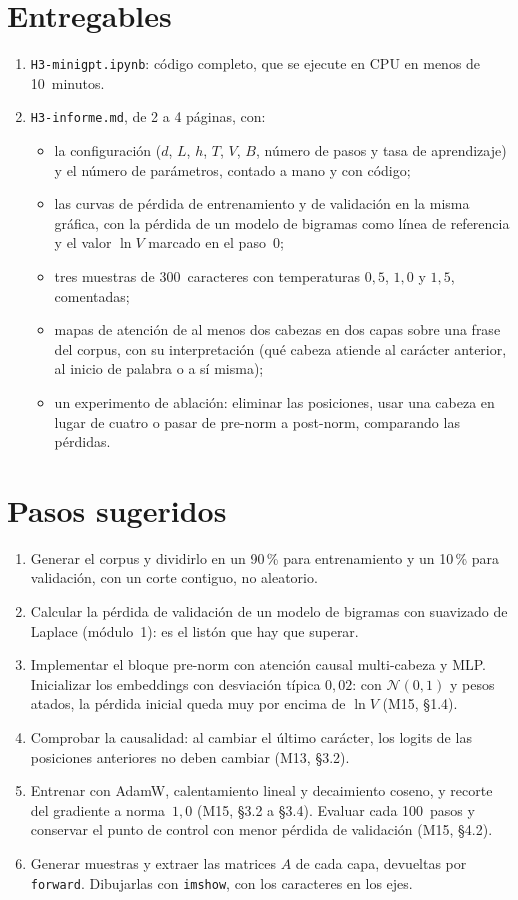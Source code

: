 \section*{Entregables}
\begin{enumerate}[label=\arabic*.]
  \item \texttt{H3-minigpt.ipynb}: código completo, que se ejecute en CPU en menos de 10~minutos.
  \item \texttt{H3-informe.md}, de 2 a 4 páginas, con:
  \begin{itemize}[label=\textendash]
    \item la configuración ($d$, $L$, $h$, $T$, $V$, $B$, número de pasos y tasa de aprendizaje) y el número de parámetros, contado a mano y con código;
    \item las curvas de pérdida de entrenamiento y de validación en la misma gráfica, con la pérdida de un modelo de bigramas como línea de referencia y el valor $\ln V$ marcado en el paso~0;
    \item tres muestras de 300~caracteres con temperaturas $0{,}5$, $1{,}0$ y $1{,}5$, comentadas;
    \item mapas de atención de al menos dos cabezas en dos capas sobre una frase del corpus, con su interpretación (qué cabeza atiende al carácter anterior, al inicio de palabra o a sí misma);
    \item un experimento de ablación: eliminar las posiciones, usar una cabeza en lugar de cuatro o pasar de pre-norm a post-norm, comparando las pérdidas.
  \end{itemize}
\end{enumerate}

\section*{Pasos sugeridos}
\begin{enumerate}[label=\arabic*.]
  \item Generar el corpus y dividirlo en un 90\,\% para entrenamiento y un 10\,\% para validación, con un corte contiguo, no aleatorio.
  \item Calcular la pérdida de validación de un modelo de bigramas con suavizado de Laplace (módulo~1): es el listón que hay que superar.
  \item Implementar el bloque pre-norm con atención causal multi-cabeza y MLP. Inicializar los embeddings con desviación típica $0{,}02$: con $\mathcal N(0,1)$ y pesos atados, la pérdida inicial queda muy por encima de $\ln V$ (M15, §1.4).
  \item Comprobar la causalidad: al cambiar el último carácter, los logits de las posiciones anteriores no deben cambiar (M13, §3.2).
  \item Entrenar con AdamW, calentamiento lineal y decaimiento coseno, y recorte del gradiente a norma~$1{,}0$ (M15, §3.2 a §3.4). Evaluar cada 100~pasos y conservar el punto de control con menor pérdida de validación (M15, §4.2).
  \item Generar muestras y extraer las matrices $A$ de cada capa, devueltas por \texttt{forward}. Dibujarlas con \texttt{imshow}, con los caracteres en los ejes.
\end{enumerate}

